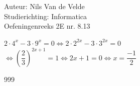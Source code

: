 \documentclass[a4paper]{article}
\begin{document}
  
\noindent \large Auteur: Nils Van de Velde \\
\noindent \large Studierichting: Informatica\\
\noindent \large Oefeningenreeks 2E nr. 8.13\\

\medskip

\normalsize

$2\cdot4^x - 3\cdot9^x = 0 \Leftrightarrow 2\cdot2^{2x} - 3\cdot3^{2x} = 0$\\

$\Leftrightarrow \left(\dfrac{2}{3}\right)^{2x+1} = 1 \Leftrightarrow 2x+1 = 0 \Leftrightarrow x = \dfrac{-1}{2}$\\

\begin{thebibliography}{999}
\end{thebibliography}
\end{document}
